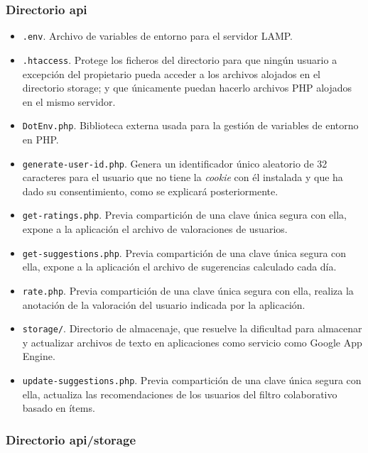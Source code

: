 \subsubsection{Directorio \guillemotleft api\guillemotright\space}

\begin{itemize}
	\item \texttt{.env}. Archivo de variables de entorno para el servidor LAMP.
	\item \texttt{.htaccess}. Protege los ficheros del directorio para que ningún usuario a excepción del propietario pueda acceder a los archivos alojados en el directorio \guillemotleft storage\guillemotright; y que únicamente puedan hacerlo archivos PHP alojados en el mismo servidor.
	\item \texttt{DotEnv.php}. Biblioteca externa usada para la gestión de variables de entorno en PHP.
	\item \texttt{generate-user-id.php}. Genera un identificador único aleatorio de 32 caracteres para el usuario que no tiene la \textit{cookie} con él instalada y que ha dado su consentimiento, como se explicará posteriormente. 
	\item \texttt{get-ratings.php}. Previa compartición de una clave única segura con ella, expone a la aplicación el archivo de valoraciones de usuarios.
	\item \texttt{get-suggestions.php}. Previa compartición de una clave única segura con ella, expone a la aplicación el archivo de sugerencias calculado cada día.
	\item \texttt{rate.php}. Previa compartición de una clave única segura con ella, realiza la anotación de la valoración del usuario indicada por la aplicación.
	\item \texttt{storage/}. Directorio de almacenaje, que resuelve la dificultad para almacenar y actualizar archivos de texto en aplicaciones como servicio como Google App Engine.
	\item \texttt{update-suggestions.php}. Previa compartición de una clave única segura con ella, actualiza las recomendaciones de los usuarios del filtro colaborativo basado en ítems. 

\end{itemize}

\subsubsection{Directorio \guillemotleft api/storage\guillemotright\space}

